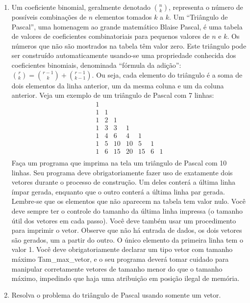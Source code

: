 \begin{enumerate}
\item   Um coeficiente binomial, geralmente denotado
  $\binom{n}{k}$, representa o número de possíveis combinações de $n$
  elementos tomados $k$ a $k$. Um ``Triângulo de Pascal'', uma homenagem
  ao grande matemático Blaise Pascal, é uma tabela de valores de
  coeficientes combinatoriais para pequenos valores de $n$ e $k$. Os
  números que não são mostrados na tabela têm valor zero. Este triângulo
  pode ser construído automaticamente usando-se uma propriedade
  conhecida dos coeficientes binomiais, denominada ``fórmula da
  adição'':
$\binom{r}{k} = \binom{r-1}{k} + \binom{r-1}{k-1}.$
Ou seja, cada elemento do triângulo é a soma de dois elementos da linha
anterior, um da mesma coluna e um da coluna anterior. 
Veja  um  exemplo de  um  triângulo  de Pascal  com  7  linhas:
\[\begin{array}{ccccccc}
1 \\
1 & 1 \\
1 & 2 & 1 \\
1 & 3 & 3 & 1 \\
1 & 4 & 6 & 4 & 1 \\
1 & 5 & 10 & 10 & 5 & 1 \\
1 & 6 & 15 & 20 & 15 & 6 & 1 \\
\end{array}
\]
Faça um programa que imprima na tela um triângulo de Pascal
com 10 linhas.  Seu programa deve obrigatoriamente fazer uso de
exatamente dois vetores durante o processo de construção. Um deles
conterá a última linha ímpar gerada, enquanto que o outro conterá a
última linha par gerada. Lembre-se que os elementos que não aparecem na
tabela tem valor nulo. Você deve sempre ter o controle do tamanho da
última linha impressa (o tamanho útil dos vetores em cada passo). Você
deve também usar um procedimento para imprimir o vetor. Observe que não
há entrada de dados, os dois vetores são gerados, um a partir do outro.
O único elemento da primeira linha tem o valor 1. Você deve
obrigatoriamente declarar um tipo vetor com tamanho máximo
Tam\_max\_vetor, e o seu programa deverá tomar cuidado para manipular
corretamente vetores de tamanho menor do que o tamanho máximo, impedindo
que haja uma atribuição em posição ilegal de memória. 


\item Resolva o problema do triângulo de Pascal usando somente um vetor.


\end{enumerate}
